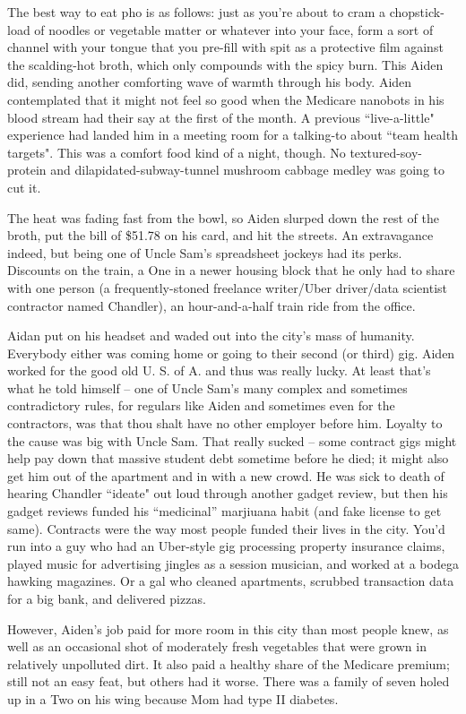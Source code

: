 \documentclass[11pt]{book}
\begin{document}
	The best way to eat pho is as follows: just as you're about to cram a chopstick-load of noodles or vegetable matter or whatever into your face, form a sort of channel with your tongue that you pre-fill with spit as a protective film against the scalding-hot broth, which only compounds with the spicy burn. This Aiden did, sending another comforting wave of warmth through his body. Aiden contemplated that it might not feel so good when the Medicare nanobots in his blood stream had their say at the first of the month. A previous ``live-a-little" experience had landed him in a meeting room for a talking-to about ``team health targets". This was a comfort food kind of a night, though. No textured-soy-protein and dilapidated-subway-tunnel mushroom cabbage medley was going to cut it.
	
	The heat was fading fast from the bowl, so Aiden slurped down the rest of the broth, put the bill of \$51.78 on his card, and hit the streets. An extravagance indeed, but being one of Uncle Sam's spreadsheet jockeys had its perks. Discounts on the train, a One in a newer housing block that he only had to share with one person (a frequently-stoned freelance writer/Uber driver/data scientist contractor named Chandler), an hour-and-a-half train ride from the office.
	
	Aidan put on his headset and waded out into the city's mass of humanity. Everybody either was coming home or going to their second (or third) gig. Aiden worked for the good old U. S. of A. and thus was really lucky. At least that's what he told himself -- one of Uncle Sam's many complex and sometimes contradictory rules, for regulars like Aiden and sometimes even for the contractors, was that thou shalt have no other employer before him. Loyalty to the cause was big with Uncle Sam. That really sucked -- some contract gigs might help pay down that massive student debt sometime before he died; it might also get him out of the apartment and in with a new crowd. He was sick to death of hearing Chandler ``ideate" out loud through another gadget review, but then his gadget reviews funded his ``medicinal'' marjiuana habit (and fake license to get same). Contracts were the way most people funded their lives in the city. You'd run into a guy who had an Uber-style gig processing property insurance claims, played music for advertising jingles as a session musician, and worked at a bodega hawking magazines. Or a gal who cleaned apartments, scrubbed transaction data for a big bank, and delivered pizzas.
	
	However, Aiden's job paid for more room in this city than most people knew, as well as an occasional shot of moderately fresh vegetables that were grown in relatively unpolluted dirt. It also paid a healthy share of the Medicare premium; still not an easy feat, but others had it worse. There was a family of seven holed up in a Two on his wing because Mom had type II diabetes.
	
\end{document}
